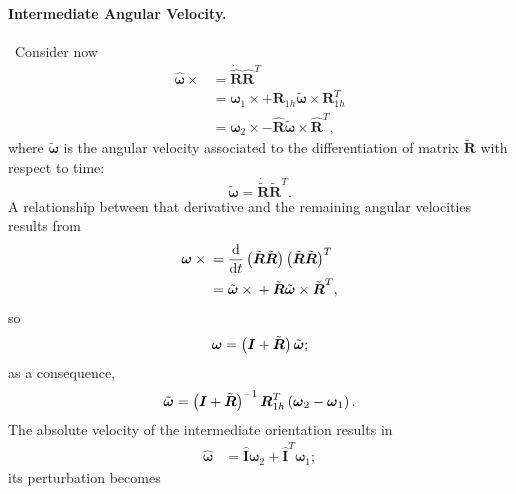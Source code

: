 \documentclass[10pt,dvips,fleqn,subeqn]{report}
\newcommand{\T}[1]{\boldsymbol{#1}}
\newcommand{\TT}[1]{\boldsymbol{#1}}
\begin{document}
\paragraph{Intermediate Angular Velocity.} \
Consider now
\begin{align}
	\hat{\T{\omega}}\times{}
	&= \dot{\hat{\T{R}}} \hat{\T{R}}^T \\
	&= \T{\omega}_{1} \times
		+ \T{R}_{1h} \tilde{\T{\omega}}\times \T{R}_{1h}^T \\
	&= \T{\omega}_{2} \times
		- \hat{\T{R}} \tilde{\T{\omega}}\times \hat{\T{R}}^T ,
\end{align}
where $\tilde{\T{\omega}}$ is the angular velocity associated
to the differentiation of matrix $\tilde{\T{R}}$ with respect to time:
\begin{equation}
	\tilde{\T{\omega}}
	= \dot{\tilde{\T{R}}} \tilde{\T{R}}^T .
\end{equation}
A relationship between that derivative and the remaining angular velocities
results from
\begin{align}
	\T{\omega} \times{}
	&= \frac{\mathrm{d}}{\mathrm{d}t}\plbr{
		\tilde{\T{R}} \tilde{\T{R}}
	} \plbr{
		\tilde{\T{R}} \tilde{\T{R}}
	}^T \\
	&= \tilde{\T{\omega}} \times{}
	+ \tilde{\T{R}} \tilde{\T{\omega}} \times \tilde{\T{R}}^T ,
\end{align}
so
\begin{equation}
	\T{\omega} = \plbr{\T{I} + \tilde{\T{R}}} \tilde{\T{\omega}} ;
\end{equation}
as a consequence,
\begin{equation}
	\tilde{\T{\omega}}
	= \plbr{\T{I} + \tilde{\T{R}}}^{-1} \T{R}_{1h}^T \plbr{
		\T{\omega}_2 - \T{\omega}_1
	} .
\end{equation}
The absolute velocity of the intermediate orientation results in
\begin{align}
	\hat{\T{\omega}}
	&= \hat{\TT{I}} \T{\omega}_2
	+ \hat{\TT{I}}^T \T{\omega}_1 ;
	\label{eq:deformable-displacement-invariant-hat-omega}
\end{align}
its perturbation becomes
\end{document}

